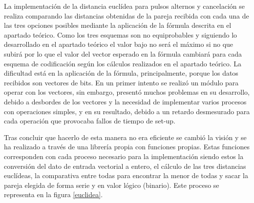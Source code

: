 La implementación de la distancia euclídea para pulsos alternos y cancelación se 
realiza comparando las distancias obtenidas de la pareja recibida con cada una de 
las tres opciones posibles mediante la aplicación de la fórmula descrita en el 
apartado teórico. Como los tres esquemas son no equiprobables y siguiendo lo 
desarrollado en el apartado teórico el valor bajo no será el máximo si no que subirá 
por lo que el valor del vector esperado en la fórmula cambiará para cada esquema de 
codificación según los cálculos realizados en el apartado teórico.
La dificultad está en la aplicación de la fórmula, principalmente,
porque los datos recibidos son vectores de bits. En un primer intento se realizó un 
módulo para operar con los vectores, sin embargo, presentó muchos problemas en
su desarrollo, debido a desbordes de los vectores y la necesidad de implementar varios
procesos con operaciones simples, y en su resultado, debido a un retardo desmesurado
para cada operación que provocaba fallos de tiempo de set-up. 

Tras concluir que hacerlo
de esta manera no era eficiente se cambió la visión y se ha realizado a través de una 
librería propia con funciones propias. Estas funciones corresponden con cada proceso 
necesario para la implementación siendo estos la conversión del dato de entrada 
vectorial a entero, el cálculo de las tres distancias euclídeas, la comparativa entre
todas para encontrar la menor de todas y sacar la pareja elegida de forma serie y en 
valor lógico (binario). Este proceso se representa en la figura \ref{euclidea}.

